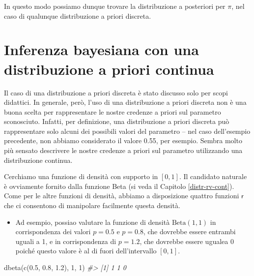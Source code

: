 \documentclass[
  11pt,
]{krantz}
\makeatletter
\newenvironment{Shaded}{\begin{snugshade}}{\end{snugshade}}
\newcommand{\CommentTok}[1]{\textcolor[rgb]{0.37,0.37,0.37}{\textit{#1}}}
\newcommand{\DecValTok}[1]{\textcolor[rgb]{0.06,0.06,0.06}{#1}}
\newcommand{\FloatTok}[1]{\textcolor[rgb]{0.06,0.06,0.06}{#1}}
\newcommand{\FunctionTok}[1]{\textcolor[rgb]{0,0,0}{#1}}
\newcommand{\NormalTok}[1]{#1}
\newcommand{\SpecialCharTok}[1]{\textcolor[rgb]{0,0,0}{#1}}
\providecommand{\tightlist}{%
  \setlength{\itemsep}{0pt}\setlength{\parskip}{0pt}}
\newenvironment{kframe}{%
\medskip{}
\setlength{\fboxsep}{.8em}
 \def\at@end@of@kframe{}%
 \ifinner\ifhmode%
  \def\at@end@of@kframe{\end{minipage}}%
  \begin{minipage}{\columnwidth}%
 \fi\fi%
 \def\FrameCommand##1{\hskip\@totalleftmargin \hskip-\fboxsep
 \colorbox{shadecolor}{##1}\hskip-\fboxsep
     \hskip-\linewidth \hskip-\@totalleftmargin \hskip\columnwidth}%
 \MakeFramed {\advance\hsize-\width
   \@totalleftmargin\z@ \linewidth\hsize
   \@setminipage}}%
 {\par\unskip\endMakeFramed%
 \at@end@of@kframe}
\renewenvironment{Shaded}{\begin{kframe}}{\end{kframe}}
\theoremstyle{definition}
\theoremstyle{definition}
\theoremstyle{definition}
\theoremstyle{definition}
\theoremstyle{remark}
\makeatother
\begin{document}
\begin{Shaded}
\end{Shaded}

In questo modo possiamo dunque trovare la distribuzione a posteriori per \(\pi\), nel caso di qualunque distribuzione a priori discreta.

\hypertarget{ch-prior-cont-binom}{%
\section{Inferenza bayesiana con una distribuzione a priori continua}\label{ch-prior-cont-binom}}

Il caso di una distribuzione a priori discreta è stato discusso solo per scopi didattici. In generale, però, l'uso di una distribuzione a priori discreta non è una buona scelta per rappresentare le nostre credenze a priori sul parametro sconosciuto. Infatti, per definizione, una distribuzione a priori discreta può rappresentare solo alcuni dei possibili valori del parametro -- nel caso dell'esempio precedente, non abbiamo considerato il valore 0.55, per esempio. Sembra molto più sensato descrivere le nostre credenze a priori sul parametro utilizzando una distribuzione continua.

Cerchiamo una funzione di densità con supporto in \([0, 1]\). Il candidato naturale è ovviamente fornito dalla funzione Beta (si veda il Capitolo \ref{distr-rv-cont}). Come per le altre funzioni di densità, abbiamo a disposizione quattro funzioni \(\textsf{r}\) che ci consentono di manipolare facilmente questa densità.

\begin{itemize}
\tightlist
\item
  Ad esempio, possiao valutare la funzione di densità \(\mbox{Beta}(1, 1)\) in corrispondenza dei valori \(p = 0.5\) e \(p = 0.8\), che dovrebbe essere entrambi uguali a 1, e in corrispondenza di \(p = 1.2\), che dovrebbe essere ugualea 0 poiché questo valore è al di fuori dell'intervallo \([ 0, 1]\).
\end{itemize}

\begin{Shaded}
\begin{Highlighting}[]
\FunctionTok{dbeta}\NormalTok{(}\FunctionTok{c}\NormalTok{(}\FloatTok{0.5}\NormalTok{, }\FloatTok{0.8}\NormalTok{, }\FloatTok{1.2}\NormalTok{), }\DecValTok{1}\NormalTok{, }\DecValTok{1}\NormalTok{)}
\CommentTok{\#\textgreater{} [1] 1 1 0}
\end{Highlighting}
\end{Shaded}
\end{document}
